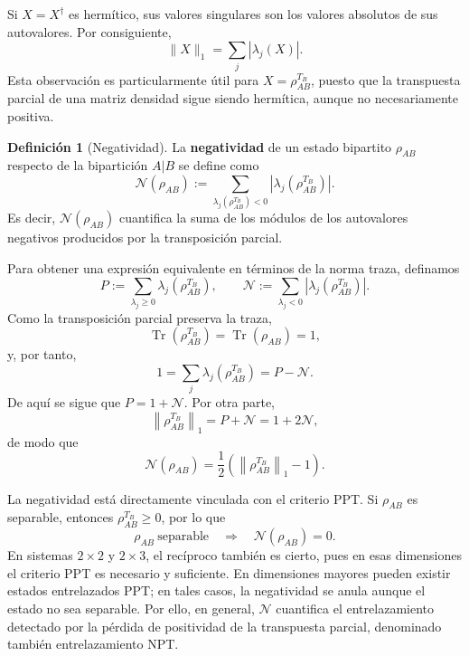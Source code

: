 \documentclass[12pt,a4paper]{article}
\theoremstyle{definition}
\newtheorem{definicion}{Definición}[section]
\theoremstyle{plain}
\theoremstyle{remark}
\newcommand{\TrA}{\operatorname{Tr}}
\begin{document}
Si $X=X^{\dagger}$ es hermítico, sus valores singulares son los valores absolutos de sus autovalores. Por consiguiente,
\begin{equation*}
    \|X\|_1=\sum_j \left|\lambda_j(X)\right|.
\end{equation*}
Esta observación es particularmente útil para $X=\rho_{AB}^{T_B}$, puesto que la transpuesta parcial de una matriz densidad sigue siendo hermítica, aunque no necesariamente positiva.

\begin{definicion}[Negatividad]
La \textbf{negatividad} de un estado bipartito $\rho_{AB}$ respecto de la bipartición $A|B$ se define como
\begin{equation*}
    \mathcal{N}(\rho_{AB})
    :=\sum_{\lambda_j(\rho_{AB}^{T_B})<0}
    \left|\lambda_j(\rho_{AB}^{T_B})\right|.
\end{equation*}
Es decir, $\mathcal{N}(\rho_{AB})$ cuantifica la suma de los módulos de los autovalores negativos producidos por la transposición parcial.
\end{definicion}

Para obtener una expresión equivalente en términos de la norma traza, definamos
\begin{equation*}
    P:=\sum_{\lambda_j\geq 0}\lambda_j\!\left(\rho_{AB}^{T_B}\right),
    \qquad
    \mathcal{N}:=\sum_{\lambda_j<0}\left|\lambda_j\!\left(\rho_{AB}^{T_B}\right)\right|.
\end{equation*}
Como la transposición parcial preserva la traza,
\begin{equation*}
    \TrA\!\left(\rho_{AB}^{T_B}\right)
    =\TrA(\rho_{AB})=1,
\end{equation*}
y, por tanto,
\begin{equation*}
    1
    =\sum_j\lambda_j\!\left(\rho_{AB}^{T_B}\right)
    =P-\mathcal{N}.
\end{equation*}
De aquí se sigue que $P=1+\mathcal{N}$. Por otra parte,
\begin{equation*}
    \left\|\rho_{AB}^{T_B}\right\|_1
    =P+\mathcal{N}
    =1+2\mathcal{N},
\end{equation*}
de modo que
\begin{equation*}
    \boxed{
    \mathcal{N}(\rho_{AB})
    =\frac{1}{2}\left(
        \left\|\rho_{AB}^{T_B}\right\|_1-1
    \right)}.
\end{equation*}

La negatividad está directamente vinculada con el criterio PPT. Si $\rho_{AB}$ es separable, entonces $\rho_{AB}^{T_B}\geq 0$, por lo que
\begin{equation*}
    \rho_{AB}\ \text{separable}
    \quad\Longrightarrow\quad
    \mathcal{N}(\rho_{AB})=0.
\end{equation*}
En sistemas $2\times 2$ y $2\times 3$, el recíproco también es cierto, pues en esas dimensiones el criterio PPT es necesario y suficiente. En dimensiones mayores pueden existir estados entrelazados PPT; en tales casos, la negatividad se anula aunque el estado no sea separable. Por ello, en general, $\mathcal{N}$ cuantifica el entrelazamiento detectado por la pérdida de positividad de la transpuesta parcial, denominado también entrelazamiento NPT.
\end{document}
